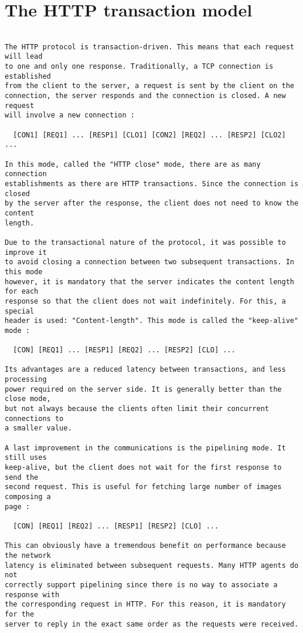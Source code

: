 
\section{The HTTP transaction model}

\begin{verbatim}

The HTTP protocol is transaction-driven. This means that each request will lead
to one and only one response. Traditionally, a TCP connection is established
from the client to the server, a request is sent by the client on the
connection, the server responds and the connection is closed. A new request
will involve a new connection :

  [CON1] [REQ1] ... [RESP1] [CLO1] [CON2] [REQ2] ... [RESP2] [CLO2] ...

In this mode, called the "HTTP close" mode, there are as many connection
establishments as there are HTTP transactions. Since the connection is closed
by the server after the response, the client does not need to know the content
length.

Due to the transactional nature of the protocol, it was possible to improve it
to avoid closing a connection between two subsequent transactions. In this mode
however, it is mandatory that the server indicates the content length for each
response so that the client does not wait indefinitely. For this, a special
header is used: "Content-length". This mode is called the "keep-alive" mode :

  [CON] [REQ1] ... [RESP1] [REQ2] ... [RESP2] [CLO] ...

Its advantages are a reduced latency between transactions, and less processing
power required on the server side. It is generally better than the close mode,
but not always because the clients often limit their concurrent connections to
a smaller value.

A last improvement in the communications is the pipelining mode. It still uses
keep-alive, but the client does not wait for the first response to send the
second request. This is useful for fetching large number of images composing a
page :

  [CON] [REQ1] [REQ2] ... [RESP1] [RESP2] [CLO] ...

This can obviously have a tremendous benefit on performance because the network
latency is eliminated between subsequent requests. Many HTTP agents do not
correctly support pipelining since there is no way to associate a response with
the corresponding request in HTTP. For this reason, it is mandatory for the
server to reply in the exact same order as the requests were received.


\end{verbatim}
